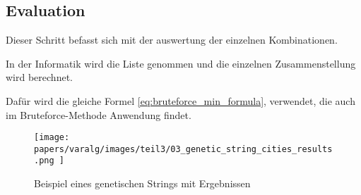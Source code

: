 %
%
%
%
\subsection{Evaluation
\label{buch:paper:varalg:subsection:evaluation}}
Dieser Schritt befasst sich mit der auswertung der einzelnen 
Kombinationen.

In der Informatik wird die Liste genommen und die einzelnen 
Zusammenstellung wird berechnet.

Dafür wird die gleiche Formel \ref{eq:bruteforce_min_formula}, 
verwendet, die auch im Bruteforce-Methode Anwendung findet.

\begin{figure}
	\centering
	\texttt{[image: 
        papers/varalg/images/teil3/03\_genetic\_string\_cities\_results.png
        ]}
	\caption{Beispiel eines genetischen Strings mit Ergebnissen}
	\label{fig:cities_genetic_string_results}
\end{figure}

